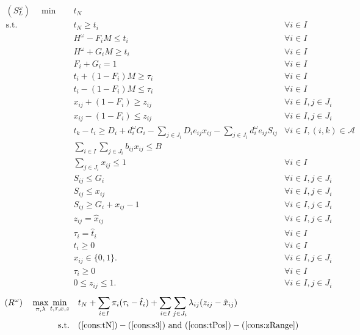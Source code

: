 \documentclass[11pt]{article}
\begin{document}
	\begin{subequations}
		\label{prob:subLocal}
		\begin{align}
		(S^\omega_L) \quad \min \quad & t_N & \\
		\text{s.t.} \quad & t_N \geq t_i & \forall i \in I \label{cons:tN}\\
		& H^\omega - F_i M \leq t_i & \forall i \in I \\
		& H^\omega + G_i M \geq t_i & \forall i \in I \\
		& F_i + G_i = 1 & \forall i \in I \\
		& t_i + (1-F_i) M \geq \tau_i & \forall i \in I\\
		& t_i - (1-F_i) M \leq \tau_i & \forall i \in I \\
		& x_{ij} + (1-F_i) \geq z_{ij} & \forall i \in I, j \in J_i \\
		& x_{ij} - (1-F_i) \leq z_{ij} & \forall i \in I, j \in J_i \\
		& t_k - t_i \geq D_i + d_i^\omega G_i -\sum_{j \in J_i} D_i e_{ij} x_{ij} - \sum_{j \in J_i} d_i^\omega e_{ij} S_{ij} & \forall i \in I, (i,k) \in \mathcal{A}\\
		&\sum_{i \in I} \sum_{j \in J_i} b_{ij} x_{ij} \leq B &\\
		& \sum_{j \in J_i} x_{ij} \leq 1 & \forall i \in I\\
		& S_{ij} \leq G_i & \forall i \in I, j \in J_i \\
		& S_{ij} \leq x_{ij} & \forall i \in I, j \in J_i\\
		& S_{ij} \geq G_i + x_{ij} - 1 & \forall i \in I, j \in J_i \label{cons:s3}\\
		& z_{ij} = \hat{x}_{ij} & \forall i \in I, j \in J_i \label{cons:local1}\\
		& \tau_{i} = \hat{t}_{i} & \forall i \in I \label{cons:local2}\\
		& t_i \geq 0 & \forall i \in I \label{cons:tPos}\\
		& x_{ij} \in \{0,1\}. & \forall i \in I, j \in J_i\\
		& \tau_i \geq 0 & \forall i \in I \\
		& 0 \leq z_{ij} \leq 1 . & \forall i \in I, j \in J_i \label{cons:zRange}
		\end{align}
	\end{subequations}
	\begin{subequations}
		\label{prob:LagDual}
		\begin{align}
		(R^\omega) \quad \max_{\pi,\lambda} \min_{t,\tau,x,z} \quad & t_N + \sum_{i \in I} \pi_i(\tau_{i} - \hat{t}_i) + \sum_{i \in I} \sum_{j \in J_i} \lambda_{ij}(z_{ij} - \hat{x}_{ij}) & \\
		\text{s.t.} \quad & (\ref{cons:tN}) - (\ref{cons:s3})\text{ and } (\ref{cons:tPos}) - (\ref{cons:zRange}) \label{cons:X}
		\end{align}
	\end{subequations}
\end{document}
